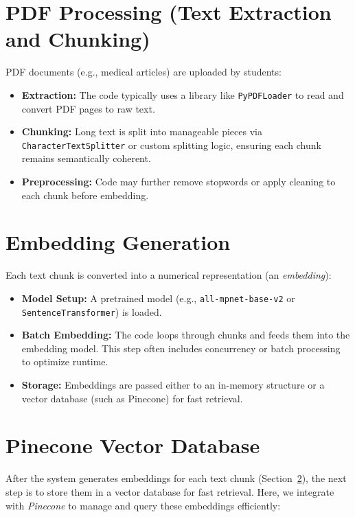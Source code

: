 \section{PDF Processing (Text Extraction and Chunking)}
\label{sec:pdf-chunking}
PDF documents (e.g., medical articles) are uploaded by students:
\begin{itemize}
    \item \textbf{Extraction:} The code typically uses a library like \texttt{PyPDFLoader} to read and convert PDF pages to raw text.
    \item \textbf{Chunking:} Long text is split into manageable pieces via \texttt{CharacterTextSplitter} or custom splitting logic, ensuring each chunk remains semantically coherent. 
    \item \textbf{Preprocessing:} Code may further remove stopwords or apply cleaning to each chunk before embedding.
\end{itemize}

\section{Embedding Generation}
\label{sec:embedding}
Each text chunk is converted into a numerical representation (an \textit{embedding}):
\begin{itemize}
    \item \textbf{Model Setup:} A pretrained model (e.g., \texttt{all-mpnet-base-v2} or \texttt{SentenceTransformer}) is loaded.
    \item \textbf{Batch Embedding:} The code loops through chunks and feeds them into the embedding model. This step often includes concurrency or batch processing to optimize runtime.
    \item \textbf{Storage:} Embeddings are passed either to an in-memory structure or a vector database (such as Pinecone) for fast retrieval.
\end{itemize}

\section{Pinecone Vector Database}
\label{sec:pinecone}

After the system generates embeddings for each text chunk (Section~\ref{sec:embedding}), the next step is to store them in a vector database for fast retrieval. Here, we integrate with \emph{Pinecone} to manage and query these embeddings efficiently:

